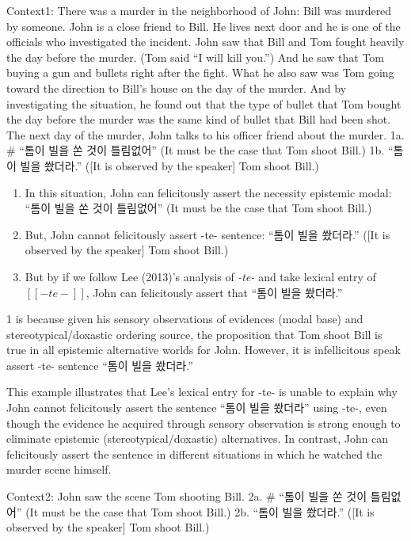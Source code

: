 Context1: There was a murder in the neighborhood of John: Bill was
murdered by someone. John is a close friend to Bill. He lives next door
and he is one of the officials who investigated the incident. John saw
that Bill and Tom fought heavily the day before the murder. (Tom said
``I will kill you.'') And he saw that Tom buying a gun and bullets right
after the fight. What he also saw was Tom going toward the direction to
Bill's house on the day of the murder. And by investigating the
situation, he found out that the type of bullet that Tom bought the day
before the murder was the same kind of bullet that Bill had been shot.
The next day of the murder, John talks to his officer friend about the
murder. 1a. \# ``톰이 빌을 쏜 것이 틀림없어'' (It must be the case that
Tom shoot Bill.) 1b. ``톰이 빌을 쐈더라.'' ({[}It is observed by the
speaker{]} Tom shoot Bill.)

\begin{enumerate}
\def\labelenumi{\arabic{enumi}.}
\tightlist
\item
  In this situation, John can felicitously assert the necessity
  epistemic modal: ``톰이 빌을 쏜 것이 틀림없어'' (It must be the case
  that Tom shoot Bill.)
\item
  But, John cannot felicitously assert -te- sentence: ``톰이 빌을
  쐈더라.'' ({[}It is observed by the speaker{]} Tom shoot Bill.)
\item
  But by if we follow Lee (2013)'s analysis of \emph{-te-} and take
  lexical entry of \([[-te-]]\), John can felicitously assert that
  ``톰이 빌을 쐈더라.''
\end{enumerate}

1 is because given his sensory observations of evidences (modal base)
and stereotypical/doxastic ordering source, the proposition that Tom
shoot Bill is true in all epistemic alternative worlds for John.
However, it is infellicitous speak assert -te- sentence ``톰이 빌을
쐈더라.''

This example illustrates that Lee's lexical entry for -te- is unable to
explain why John cannot felicitously assert the sentence ``톰이 빌을
쐈더라'' using -te-, even though the evidence he acquired through
sensory observation is strong enough to eliminate epistemic
(stereotypical/doxastic) alternatives. In contrast, John can
felicitously assert the sentence in different situations in which he
watched the murder scene himself.

Context2: John saw the scene Tom shooting Bill. 2a. \# ``톰이 빌을 쏜
것이 틀림없어'' (It must be the case that Tom shoot Bill.) 2b. ``톰이
빌을 쐈더라.'' ({[}It is observed by the speaker{]} Tom shoot Bill.)

